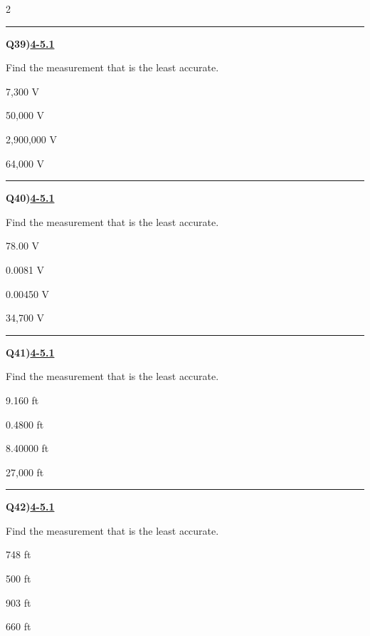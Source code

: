 \documentclass[11pt]{article}
\newenvironment{Qbox}[2]{%
  \par\medskip\noindent\begin{minipage}{\linewidth}%
  \hrule\medskip%
  \textbf{Q#1)}\hfill\textbf{\underline{#2}}\par\smallskip%
}{\par\end{minipage}\par\medskip}
\begin{document}
\begin{multicols}{2}
\begin{Qbox}{39}{4-5.1}
Find the measurement that is the least accurate.
\begin{choices}
  \item 7,300 V
  \item 50,000 V
  \item 2,900,000 V
  \item 64,000 V
\end{choices}
\end{Qbox}

\begin{Qbox}{40}{4-5.1}
Find the measurement that is the least accurate.
\begin{choices}
  \item 78.00 V
  \item 0.0081 V
  \item 0.00450 V
  \item 34,700 V
\end{choices}
\end{Qbox}

\begin{Qbox}{41}{4-5.1}
Find the measurement that is the least accurate.
\begin{choices}
  \item 9.160 ft
  \item 0.4800 ft
  \item 8.40000 ft
  \item 27,000 ft
\end{choices}
\end{Qbox}

\begin{Qbox}{42}{4-5.1}
Find the measurement that is the least accurate.
\begin{choices}
  \item 748 ft
  \item 500 ft
  \item 903 ft
  \item 660 ft
\end{choices}
\end{Qbox}


\end{multicols}
\end{document}
